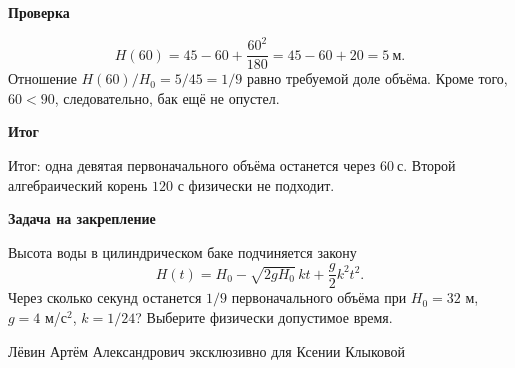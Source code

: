 \documentclass[12pt,a4paper]{article}
\newcommand{\reviewline}[1]{\par\medskip\textbf{#1}\par\smallskip}
\begin{document}
\reviewline{Проверка}
\[
H(60)=45-60+\frac{60^2}{180}
=45-60+20=5\ \text{м}.
\]
Отношение $H(60)/H_0=5/45=1/9$ равно требуемой доле объёма. Кроме того, $60<90$, следовательно, бак ещё не опустел.

\reviewline{Итог}
\textcolor{teal!60!black}{Итог:} одна девятая первоначального объёма останется через $\boxed{60\ \text{с}}$. Второй алгебраический корень $120$ с физически не подходит.

\reviewline{Задача на закрепление}
Высота воды в цилиндрическом баке подчиняется закону
\[
H(t)=H_0-\sqrt{2gH_0}\,kt+\frac{g}{2}k^2t^2.
\]
Через сколько секунд останется $1/9$ первоначального объёма при $H_0=32$ м, $g=4$ м/с$^2$, $k=1/24$? Выберите физически допустимое время.

\vfill
\begin{center}
\footnotesize Лёвин Артём Александрович эксклюзивно для Ксении Клыковой
\end{center}
\end{document}

